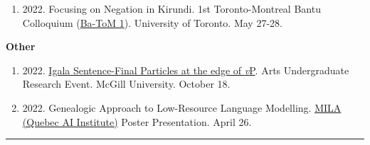 \documentclass[margin,line]{resume}
\begin{document}
\begin{resume}
\begin{enumerate}[-, leftmargin=1em, topsep=0.5pt]
		\item[] {2022. Focusing on Negation in Kirundi. 1st Toronto-Montreal Bantu Colloquium (\href{https://mcling.blogs.mcgill.ca/2022/05/24/mcgill-at-ba-tom-1/}{Ba-ToM 1}). University of Toronto. May 27-28.}
	\end{enumerate}
	
\begin{comment}
	\textbf{Reading Group \& Labs}
	\begin{enumerate}[-, leftmargin=1em, topsep=0.5pt]
		\item[] {2023. \href{https://mcling.blogs.mcgill.ca/2023/01/15/mull-lab-1-17-brandon-chaperon/}{A negative alternation: Negation head movement allomorphy in Igala}. \href{https://mull-lab.org/}{MULL Lab} meeting. McGill University. January 17.}

		\item[] {2022. \href{https://mcling.blogs.mcgill.ca/2022/03/27/mull-lab-03-30-brandon-chaperon/}{Igala's Dual Negation}. \href{https://mull-lab.org/}{MULL Lab} meeting. McGill University. March 30.}
	\end{enumerate}
\end{comment}

	\textbf{Other}
	\begin{enumerate}[-, leftmargin=1em, topsep=0.5pt]
		\item[] {2022. \href{https://www.mcgill.ca/arts-internships/files/arts-internships/brandon_chaperon.pdf}{Igala Sentence-Final Particles at the edge of \textit{v}P}. Arts Undergraduate Research Event. McGill University. October 18.}

		\item[] {2022. Genealogic Approach to Low-Resource Language Modelling. \href{https://mila.quebec/en/}{MILA (Quebec AI Institute)} Poster Presentation. April 26.}

	\end{enumerate}


	\vspace{-0.6em}\rule{\textwidth}{0.4pt}


	\begin{comment}
	\section{\mysidestyle Teaching}

	\href{https://www.mcgill.ca/study/2023-2024/courses/ling-410}{LING 410 - Structure of Wolof} undergraduate class for \href{https://inamartinovic.com/}{Martina Martinović}.\\
	McGill University.
	\hfill Feb 28 2024


\end{comment}
\end{resume}
\end{document}
